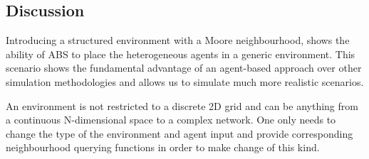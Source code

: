 \subsection{Discussion}
Introducing a structured environment with a Moore neighbourhood, shows the ability of ABS to place the heterogeneous agents in a generic environment. This scenario shows the fundamental advantage of an agent-based approach over other simulation methodologies and allows us to simulate much more realistic scenarios.

An environment is not restricted to a discrete 2D grid and can be anything from a continuous N-dimensional space to a complex network. One only needs to change the type of the environment and agent input and provide corresponding neighbourhood querying functions in order to make change of this kind. 